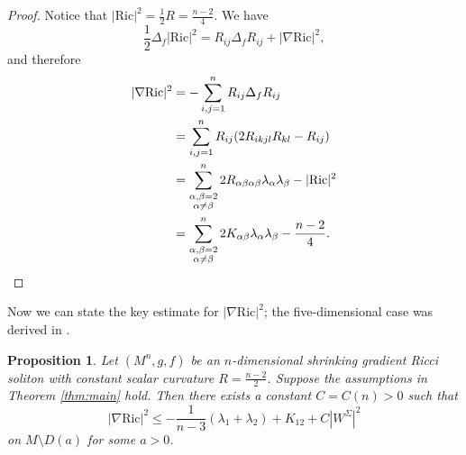 \documentclass[a4, 12pt]{amsart}
\theoremstyle{plain}
\newtheorem{prop}[theo]{Proposition}
\begin{document}
\begin{proof}
	Notice that $|\mathrm{Ric}|^2 = \frac{1}{2}R = \frac{n-2}{4}$. We have
	\[
	\frac{1}{2}\Delta_f|\mathrm{Ric}|^2 = R_{ij}\Delta_f R_{ij} + |\nabla \mathrm{Ric}|^2,
	\]
	and therefore
\begin{equation*}
	\begin{aligned}
		|\nabla \mathrm{Ric}|^2 &= -\sum_{i,j=1}^n R_{ij}\Delta_f R_{ij} \\
		&= \sum_{i,j=1}^n R_{ij}(2R_{ikjl}R_{kl} - R_{ij}) \\
		&= \sum_{\substack{\alpha,\beta=2 \\ \alpha\neq\beta}}^n 2R_{\alpha\beta\alpha\beta}\lambda_\alpha\lambda_\beta - |\mathrm{Ric}|^2 \\
		&= \sum_{\substack{\alpha,\beta=2 \\ \alpha\neq\beta}}^n 2K_{\alpha\beta}\lambda_{\alpha}\lambda_{\beta} - \frac{n-2}{4}. \qedhere
	\end{aligned}
\end{equation*}
\end{proof}

Now we can state the key estimate for $|\nabla \mathrm{Ric}|^2$; the five-dimensional case was derived in \cite{Li-Ou-Qu-Wu}.

\begin{prop}\label{prop:key-estimate}
	Let $(M^n, g, f)$ be an $n$-dimensional shrinking gradient Ricci soliton with constant scalar curvature $R = \frac{n-2}{2}$. Suppose the assumptions in Theorem \ref{thm:main} hold. Then there exists a constant $C = C(n) > 0$ such that
	\[
	|\nabla \mathrm{Ric}|^2 \leq -\frac{1}{n-3}(\lambda_1+\lambda_2) + K_{12} + C|W^{\Sigma}|^2
	\]
	on $M \setminus D(a)$ for some $a > 0$.
\end{prop}
\end{document}

